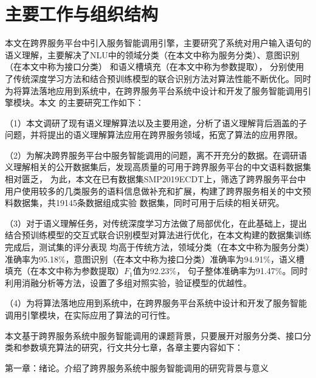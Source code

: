 \section{主要工作与组织结构}
本文在跨界服务平台中引入服务智能调用引擎，主要研究了系统对用户输入语句的语义理解，主要解决了NLU中的领域分类（在本文中称为服务分类）、意图识别（在本文中称为接口分类）
和语义槽填充（在本文中称为参数提取），
分别使用了传统深度学习方法和结合预训练模型的联合识别方法对算法性能不断优化。同时为将算法落地应用到系统中，在跨界服务平台系统中设计和开发了服务智能调用引擎模块。本文
的主要研究工作如下：

（1）本文调研了现有语义理解算法以及主要用途，分析了语义理解背后涵盖的子问题，并将提出的语义理解算法应用在跨界服务领域，拓宽了算法的应用界限。

（2）为解决跨界服务平台中服务智能调用的问题，离不开充分的数据。在调研语义理解相关的公开数据集后，发现高质量的可用于跨界服务平台的中文语料数据集相对匮乏，
为此，本文在已有数据集SMP2019ECDT上，筛选了跨界服务平台中用户使用较多的几类服务的语料信息做补充和扩展，构建了跨界服务相关的中文预料数据集，共19145条数据组成实验
数据集，同时可用于后续的相关研究。

（3）对于语义理解任务，对传统深度学习方法做了局部优化，在此基础上，提出结合预训练模型的交互式联合识别模型对算法进行优化，在本文构建的数据集训练完成后，测试集的评分表现
均高于传统方法，领域分类（在本文中称为服务分类）准确率为95.18\%，意图识别（在本文中称为接口分类）准确率为94.91\%，语义槽填充（在本文中称为参数提取）$F_1$值为92.23\%，
句子整体准确率为91.47\%。同时利用消融分析等方法，设置了多组对照实验，验证模型的优越性。

（4）为将算法落地应用到系统中，在跨界服务平台系统中设计和开发了服务智能调用引擎模块，在实际应用了算法的可行性。

本文基于跨界服务系统中服务智能调用的课题背景，只要展开对服务分类、接口分类和参数填充算法的研究，行文共分七章，各章主要内容如下：

第一章：绪论。介绍了跨界服务系统中服务智能调用的研究背景与意义